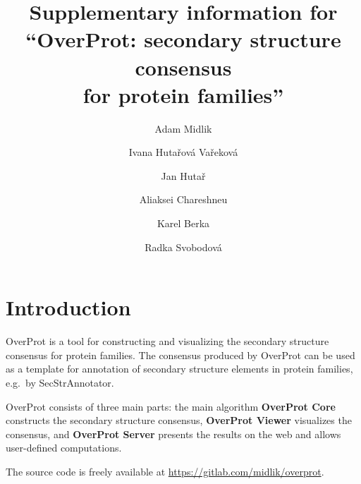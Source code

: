 \documentclass{article}
\begin{document}

\title{Supplementary information for \\ ``OverProt: secondary structure consensus \\for protein families''}

\author[1,2]{Adam Midlik}
\author[2,3,4]{Ivana Hutařová Vařeková}
\author[1,2]{Jan Hutař}
\author[1,2]{Aliaksei Chareshneu}
\author[4,*]{Karel Berka}
\author[1,2,*]{Radka Svobodová}

\date{}  %

\maketitle

\renewcommand{\contentsname}{Table of contents}
\tableofcontents
\clearpage



\section{Introduction}

OverProt is a tool for constructing and visualizing the secondary
structure consensus for protein families. The consensus produced by
OverProt can be used as a template for annotation of secondary structure
elements in protein families, e.g.~by SecStrAnnotator.

OverProt consists of three main parts: the main algorithm
\textbf{OverProt Core} constructs the secondary structure consensus,
\textbf{OverProt Viewer} visualizes the consensus, and \textbf{OverProt
Server} presents the results on the web and allows user-defined
computations.

The source code is freely available at \url{https://gitlab.com/midlik/overprot}.
\end{document}
